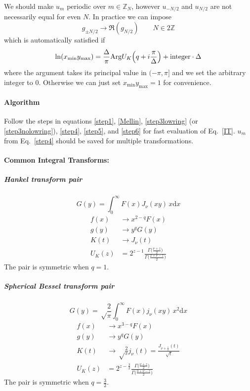 \documentclass{article}
\renewcommand{\d}{\mathrm{d}}
\newcommand{\xmin}{x_\textrm{min}}
\newcommand{\ymax}{y_\textrm{max}}
\newcommand{\Mellin}{U}
\begin{document}
We should make $u_m$ periodic over $m\in\mathbb{Z}_N$, however
$u_{-N/2}$ and $u_{N/2}$ are not necessarily equal for even $N$.
In practice we can impose
\begin{equation}
    \label{step3nolowring}
    g_{\pm N/2} \to \Re(g_{N/2}) \qquad N\in2\mathbb{Z}
\end{equation}
which is automatically satisfied if
\begin{equation}
    \label{step3lowring}
    \ln(\xmin\ymax) = \frac\Delta\pi \mathrm{Arg} \Mellin_K\Bigl(q+i\frac\pi\Delta\Bigr)
    + \textrm{integer} \cdot \Delta
\end{equation}
where the argument takes its principal value in $(-\pi,\pi]$
and we set the arbitrary integer to 0.
Otherwise we can just set $\xmin\ymax=1$ for convenience.


\paragraph{Algorithm}
Follow the steps in equations \eqref{step1}, \eqref{Mellin},
\eqref{step3lowring} (or \eqref{step3nolowring}), \eqref{step4}, \eqref{step5},
and \eqref{step6} for fast evaluation of Eq.~\eqref{IT}.
$u_m$ from Eq.~\eqref{step4} should be saved for multiple transformations.


\paragraph{Common Integral Transforms:}


\subparagraph{Hankel transform pair}
\begin{equation}
    G(y) = \int_0^\infty F(x) J_\nu(xy) \,x\d x
\end{equation}
\begin{align}
    f(x) &\to x^{2-q}F(x)  \\
    g(y) &\to y^q G(y)  \\
    K(t) &\to J_\nu(t)  \\
    \Mellin_K(z) &= 2^{z-1} \frac{\Gamma\bigl(\frac{\nu+z}2\bigr)}{\Gamma\bigl(\frac{2+\nu-z}2\bigr)}
\end{align}
The pair is symmetric when $q=1$.


\subparagraph{Spherical Bessel transform pair}
\begin{equation}
    G(y) = \sqrt\frac2\pi \int_0^\infty F(x) j_\nu(xy) \,x^2\d x
\end{equation}
\begin{align}
    f(x) &\to x^{3-q} F(x)  \\
    g(y) &\to y^q G(y)  \\
    K(t) &\to \sqrt\frac2\pi j_\nu(t) = \frac{J_{\nu+\frac12}(t)}{\sqrt t}  \\
    \Mellin_K(z) &= 2^{z-\frac32} \frac{\Gamma\bigl(\frac{\nu+z}2\bigr)}{\Gamma\bigl(\frac{3+\nu-z}2\bigr)}
\end{align}
The pair is symmetric when $q=\frac32$.
\end{document}
